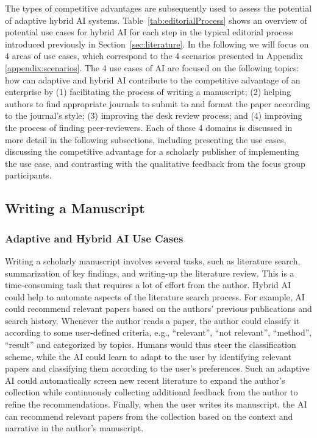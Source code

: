 



\noindent The types of competitive advantages are subsequently used to assess the potential of adaptive hybrid AI systems.
Table~\ref{tab:editorialProcess} shows an overview of potential use cases for hybrid AI for each step in the typical editorial process
introduced previously in Section~\ref{sec:literature}. In the following we will focus on 4 areas of use cases, which correspond to the 
4 scenarios presented in Appendix \ref{appendix:scenarios}. The 4 use cases of AI are focused on the following topics: how can adaptive
and hybrid AI contribute to the competitive advantage of an enterprise by (1) facilitating the process of writing a manuscript; (2) helping
authors to find appropriate journals to submit to and format the paper according to the journal's style; (3) improving the desk
review process; and (4) improving the process of finding peer-reviewers. Each of these 4 domains is discussed in more detail in the
following subsections, including presenting the use cases, discussing the competitive advantage for a scholarly publisher of
implementing the use case, and contrasting with the qualitative feedback from the focus group participants.

\subsection{Writing a Manuscript}

\subsubsection*{Adaptive and Hybrid AI Use Cases}
Writing a scholarly manuscript involves several tasks, such as literature search, summarization of key findings, and writing-up the
literature review. This is a time-consuming task that requires a lot of effort from the author. Hybrid AI could help to automate aspects
of the literature search process. For example, AI could recommend relevant papers based on the authors' previous publications and search
history. Whenever the author reads a paper, the author could classify it according to some user-defined criteria, e.g., ``relevant'',
``not relevant'', ``method'', ``result'' and categorized by topics. Humans would thus steer the classification scheme, while the AI could
learn to adapt to the user by identifying relevant papers and classifying them according to the user's preferences. Such an adaptive AI
could automatically screen new recent literature to expand the author's collection while continuously collecting additional feedback from
the author to refine the recommendations. Finally, when the user writes its manuscript, the AI can recommend relevant papers from the
collection based on the context and narrative in the author's manuscript.


